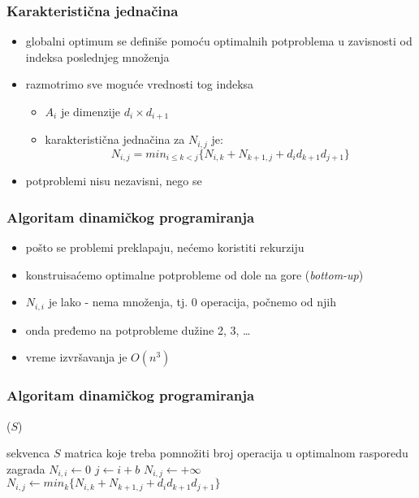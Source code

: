 \documentclass[compress,aspectratio=169]{beamer}
\begin{document}
\begin{frame}[fragile]
  \frametitle{Karakteristična jednačina}
  \begin{itemize}
    \item globalni optimum se definiše pomoću optimalnih potproblema u 
    zavisnosti od indeksa poslednjeg množenja
    \item razmotrimo sve moguće vrednosti tog indeksa
    \begin{itemize}
      \item $A_{i}$ je dimenzije $d_{i}\times d_{i+1}$
      \item karakteristična jednačina za $N_{i,j}$ je:
      $$ N_{i,j} = min_{i\leq k<j}\{ N_{i,k} + N_{k+1,j} + d_{i} d_{k+1} d_{j+1}\}$$
    \end{itemize}
    \item potproblemi nisu nezavisni, nego se 
  \end{itemize}
\end{frame}

\begin{frame}[fragile]
  \frametitle{Algoritam dinamičkog programiranja}
  \begin{itemize}
    \item pošto se problemi preklapaju, nećemo koristiti rekurziju
    \item konstruisaćemo optimalne potprobleme od dole na gore (\textit{bottom-up})
    \item $N_{i,i}$ je lako - nema množenja, tj. 0 operacija, počnemo od njih
    \item onda pređemo na potprobleme dužine 2, 3, \ldots{}
    \item vreme izvršavanja je $O(n^3)$
  \end{itemize}
\end{frame}

\begin{frame}
  \frametitle{Algoritam dinamičkog programiranja}
  ($S$)
  \begin{algorithmic}
    \REQUIRE sekvenca $S$ matrica koje treba pomnožiti
    \ENSURE broj operacija u optimalnom rasporedu zagrada
      \STATE $N_{i,i} \leftarrow 0$
    \ENDFOR
        \STATE $j \leftarrow i+b$
        \STATE $N_{i,j} \leftarrow +\infty$
          \STATE $N_{i,j} \leftarrow min_{k} \{ N_{i,k} + N_{k+1,j} + d_{i} d_{k+1} d_{j+1}\}$
        \ENDFOR
      \ENDFOR
    \ENDFOR
  \end{algorithmic}    
\end{frame}
\end{document}
